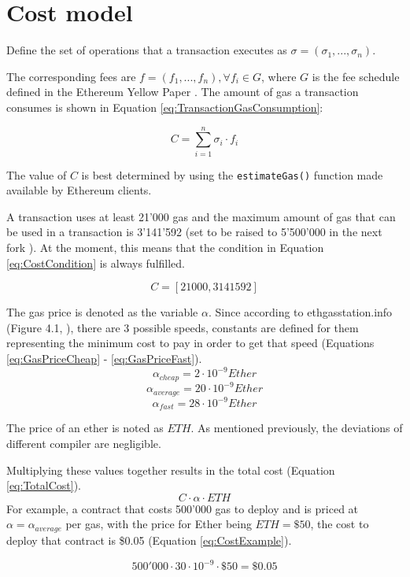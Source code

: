 \section{Cost model}

Define the set of operations that a transaction executes as $ \sigma = (\sigma_1, ..., \sigma_n) $.

The corresponding fees are $ f = (f_1, ..., f_n), \forall f_i \in G $, where $ G $ is the fee schedule defined in the Ethereum Yellow Paper \cite{YellowPaper}. The amount of gas a transaction consumes is shown in Equation \ref{eq:TransactionGasConsumption}:

\begin{equation}
C = \sum_{i = 1}^n \sigma_i \cdot f_i
\label{eq:TransactionGasConsumption}
\end{equation}

The value of $ C $ is best determined by using the \texttt{estimateGas()} function made available by Ethereum clients.

A transaction uses at least 21'000 gas and the maximum amount of gas that can be used in a transaction is 3'141'592 \cite{BlockGasLimit} (set to be raised to 5'500'000 in the next fork \cite{EIP150}). At the moment, this means that the condition in Equation \ref{eq:CostCondition} is always fulfilled.

\begin{equation}
    C = [21000, 3141592]
    \label{eq:CostCondition}
\end{equation}

The gas price is denoted as the variable $ \alpha $. Since according to ethgasstation.info (Figure 4.1, \cite{ETHGasStationCalc}), there are 3 possible speeds, constants are defined for them representing the minimum cost to pay in order to get that speed (Equations \ref{eq:GasPriceCheap} - \ref{eq:GasPriceFast}).
\begin{equation}
    \alpha_{cheap} = 2 \cdot 10^{-9} Ether
    \label{eq:GasPriceCheap}
\end{equation}
\begin{equation}
    \alpha_{average} = 20 \cdot 10^{-9} Ether
    \label{eq:GasPriceAverage}
\end{equation}
\begin{equation}
    \alpha_{fast} = 28 \cdot 10^{-9} Ether
    \label{eq:GasPriceFast}
\end{equation}

The price of an ether is noted as $ ETH $. As mentioned previously, the deviations of different compiler are negligible.

Multiplying these values together results in the total cost (Equation \ref{eq:TotalCost}). 
\begin{equation}
 C \cdot \alpha \cdot ETH
 \label{eq:TotalCost}
\end{equation}  For example, a contract that costs 500'000 gas to deploy and is priced at $ \alpha = \alpha_{average} $ per gas, with the price for Ether being $ ETH = \$50 $, the cost to deploy that contract is \$0.05 (Equation \ref{eq:CostExample}).

\begin{equation}
    500'000 \cdot 30 \cdot 10^{-9} \cdot \$50 = \$0.05
    \label{eq:CostExample}
\end{equation}
